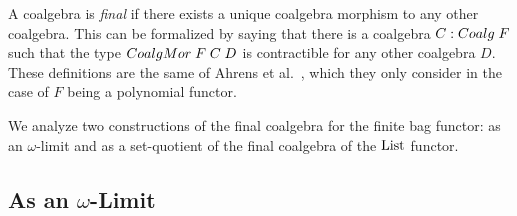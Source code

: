 \documentclass[a4paper,USenglish,cleveref]{lipics-v2021}
\begin{document}
A coalgebra is \emph{final} if there exists a unique coalgebra morphism to any other coalgebra. This can be formalized by saying that there is a coalgebra $C : \Coalg\;F$ such that the type $\CoalgMor\;F\;C\;D$ is contractible for any other coalgebra $D$. These definitions are the same of Ahrens et al.~\cite{Ahrens2015}, which they only consider in the case of $F$ being a polynomial functor.

We analyze two constructions of the final coalgebra for the finite bag functor: as an $\omega$-limit %
and as a set-quotient of the final coalgebra of the $\List$ functor. %

\subsection{As an \ensuremath{\omega}-Limit}\label{sec:final-limit-set}
\end{document}
